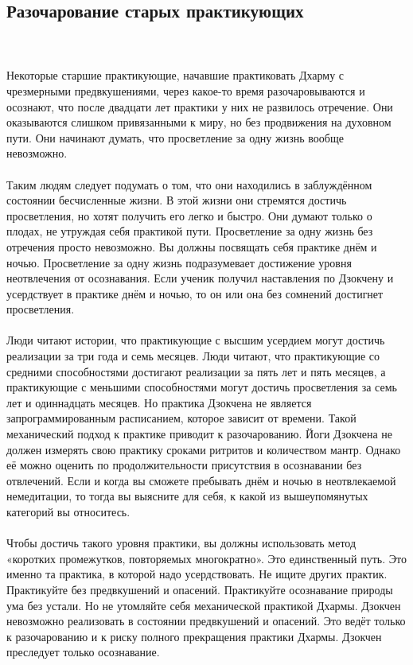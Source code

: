 \subsection{Разочарование старых практикующих}
\\ \\ Некоторые старшие практикующие, начавшие практиковать Дхарму с чрезмерными предвкушениями, через какое-то время разочаровываются и осознают, что после двадцати лет практики у них не развилось отречение. Они оказываются слишком привязанными к миру, но без продвижения на духовном пути. Они начинают думать, что просветление за одну жизнь вообще невозможно.
\\ \\ Таким людям следует подумать о том, что они находились в заблуждённом состоянии бесчисленные жизни. В этой жизни они стремятся достичь просветления, но хотят получить его легко и быстро. Они думают только о плодах, не утруждая себя практикой пути. Просветление за одну жизнь без отречения просто невозможно. Вы должны посвящать себя практике днём и ночью. Просветление за одну жизнь подразумевает достижение уровня неотвлечения от осознавания. Если ученик получил наставления по Дзокчену и усердствует в практике днём и ночью, то он или она без сомнений достигнет просветления.
\\ \\ Люди читают истории, что практикующие с высшим усердием могут достичь реализации за три года и семь месяцев. Люди читают, что практикующие со средними способностями достигают реализации за пять лет и пять месяцев, а практикующие с меньшими способностями могут достичь просветления за семь лет и одиннадцать месяцев. Но практика Дзокчена не является запрограммированным расписанием, которое зависит от времени. Такой механический подход к практике приводит к разочарованию. Йоги Дзокчена не должен измерять свою практику сроками ритритов и количеством мантр. Однако её можно оценить по продолжительности присутствия в осознавании без отвлечений. Если и когда вы сможете пребывать днём и ночью в неотвлекаемой немедитации, то тогда вы выясните для себя, к какой из вышеупомянутых категорий вы относитесь.
\newpage
\\ \\ Чтобы достичь такого уровня практики, вы должны использовать метод «коротких промежутков, повторяемых многократно». Это единственный путь. Это именно та практика, в которой надо усердствовать. Не ищите других практик. Практикуйте без предвкушений и опасений. Практикуйте осознавание природы ума без устали. Но не утомляйте себя механической практикой Дхармы. Дзокчен невозможно реализовать в состоянии предвкушений и опасений. Это ведёт только к разочарованию и к риску полного прекращения практики Дхармы. Дзокчен преследует только осознавание.
